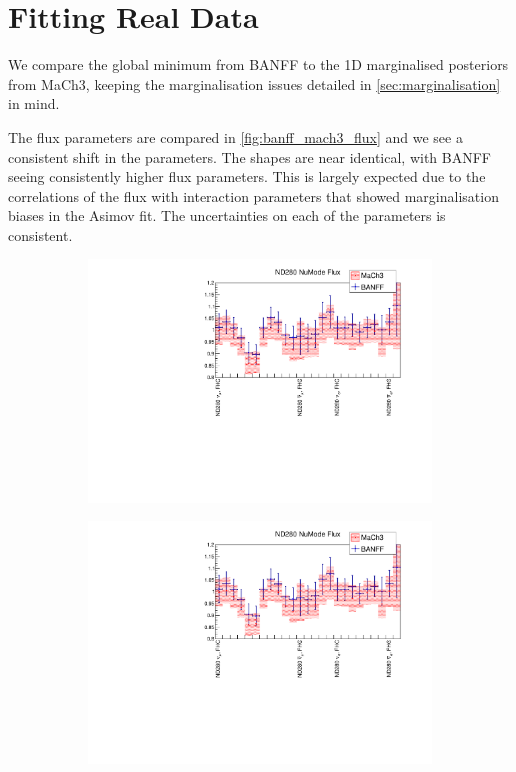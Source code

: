 \section{Fitting Real Data}
We compare the global minimum from BANFF to the 1D marginalised posteriors from MaCh3, keeping the marginalisation issues detailed in \autoref{sec:marginalisation} in mind.

The flux parameters are compared in \autoref{fig:banff_mach3_flux} and we see a consistent shift in the parameters. The shapes are near identical, with BANFF seeing consistently higher flux parameters. This is largely expected due to the correlations of the flux with interaction parameters that showed marginalisation biases in the Asimov fit. The uncertainties on each of the parameters is consistent.
\begin{figure}[h]
	\begin{subfigure}[t]{0.49\textwidth}
		\includegraphics[width=\textwidth, trim={10mm 0mm 18mm 0mm}, clip, page=1]{figures/mach3/banff/mach3banff}
	\end{subfigure}
	\begin{subfigure}[t]{0.49\textwidth}
		\includegraphics[width=\textwidth, trim={10mm 0mm 18mm 0mm}, clip, page=2]{figures/mach3/banff/mach3banff}
	\end{subfigure}
	

\end{figure}
